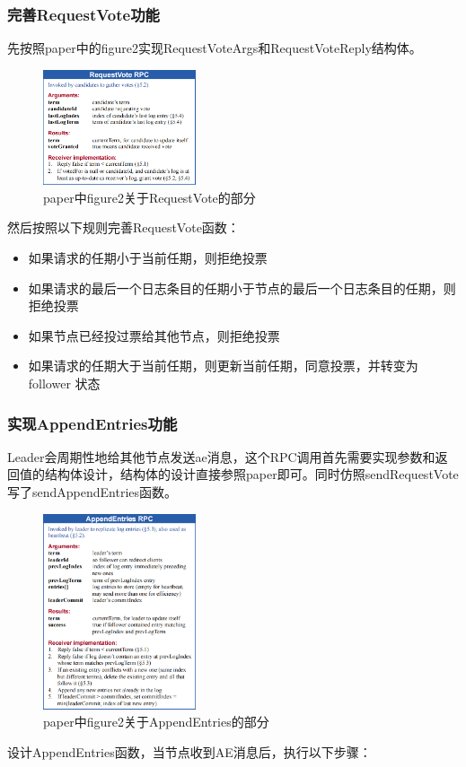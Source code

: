 \documentclass[]{article}
\begin{document}
	\subsubsection{完善RequestVote功能}
	先按照paper中的figure2实现RequestVoteArgs和RequestVoteReply结构体。
	\begin{figure}[H]
		\centering
		\includegraphics[width=0.4\textwidth]{./figure2.png}
		\caption{paper中figure2关于RequestVote的部分}
	\end{figure}
	然后按照以下规则完善RequestVote函数：
	\begin{itemize}
		\item 如果请求的任期小于当前任期，则拒绝投票
		\item 如果请求的最后一个日志条目的任期小于节点的最后一个日志条目的任期，则拒绝投票
		\item 如果节点已经投过票给其他节点，则拒绝投票
		\item 如果请求的任期大于当前任期，则更新当前任期，同意投票，并转变为 follower 状态
	\end{itemize}
	\subsubsection{实现AppendEntries功能}
	Leader会周期性地给其他节点发送ae消息，这个RPC调用首先需要实现参数和返回值的结构体设计，结构体的设计直接参照paper即可。同时仿照sendRequestVote写了sendAppendEntries函数。
	\begin{figure}[H]
		\centering
		\includegraphics[width=0.4\textwidth]{./figure3.png}
		\caption{paper中figure2关于AppendEntries的部分}
	\end{figure}
	设计AppendEntries函数，当节点收到AE消息后，执行以下步骤：
	
\end{document}
